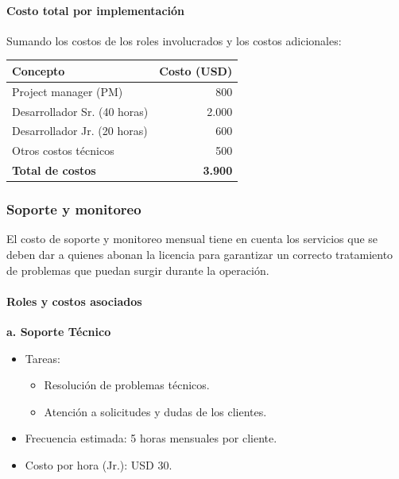 \paragraph{Costo total por implementación}

Sumando los costos de los roles involucrados y los costos adicionales:

\begin{center}
\begin{tabular}{lr}
\hline
\textbf{Concepto} & \textbf{Costo (USD)} \\
\hline
Project manager (PM) & 800 \\
Desarrollador Sr. (40 horas) & 2.000 \\
Desarrollador Jr. (20 horas) & 600 \\
Otros costos técnicos & 500 \\
\hline
\textbf{Total de costos} & \textbf{3.900} \\
\hline
\end{tabular}
\end{center}

\subsubsection{Soporte y monitoreo}

El costo de soporte y monitoreo mensual tiene en cuenta los servicios que se deben dar a quienes abonan la licencia para garantizar un correcto tratamiento de problemas que puedan surgir durante la operación.

\paragraph{Roles y costos asociados}

\textbf{a. Soporte Técnico}
\begin{itemize}
    \item Tareas:
    \begin{itemize}
        \item Resolución de problemas técnicos.
        \item Atención a solicitudes y dudas de los clientes.
    \end{itemize}
    \item Frecuencia estimada: 5 horas mensuales por cliente.
    \item Costo por hora (Jr.): USD 30.
\end{itemize}

